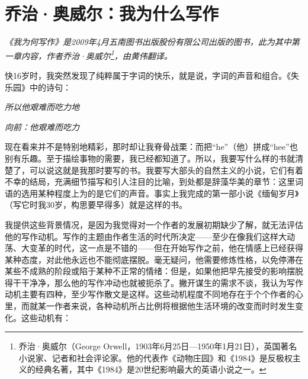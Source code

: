 \documentclass[fontset=fandol,12pt,a5paper]{ctexbook}
\begin{document}
\newpage

\section{乔治·奥威尔：我为什么写作}

\emph{《我为何写作》是2009年4月五南图书出版股份有限公司出版的图书，此为其中第一章内容，作者乔治·奥威尔\footnote{乔治·奥威尔（George Orwell，1903年6月25日—1950年1月21日），英国著名小说家、记者和社会评论家。他的代表作《动物庄园》和《1984》是反极权主义的经典名著，其中《1984》是20世纪影响最大的英语小说之一。}，由黄伟翻译。}
\vspace{2em}

快16岁时，我突然发现了纯粹属于字词的快乐，就是说，字词的声音和组合。《失乐园》中的诗句：

\centerline{\emph{所以他艰难而吃力地}}
\centerline{\emph{向前：他艰难而吃力}}

现在看来并不是特别地精彩，那时却让我脊骨战栗：而把“he”（他）拼成“hee”也别有乐趣。至于描绘事物的需要，我已经都知道了。所以，我要写什么样的书就清楚了，可以说这就是我那时要写的书。我要写大部头的自然主义的小说，它们有着不幸的结局，充满细节描写和引人注目的比喻，到处都是辞藻华美的章节：这里词语的选用某种程度上为的是它们的声音。事实上我完成的第一部小说《缅甸岁月》（写它时我30岁，构思要早得多）就是这样的书。

我提供这些背景情况，是因为我觉得对一个作者的发展初期缺少了解，就无法评估他的写作动机。写作的主题由作者生活的时代所决定——至少在像我们这样大动荡、大变革的时代，这一点是不错的——但在开始写作之前，他在情感上已经获得某种态度，对此他永远也不能彻底摆脱。毫无疑问，他需要修炼性格，以免停滞在某些不成熟的阶段或陷于某种不正常的情绪：但是，如果他把早先接受的影响摆脱得干干净净，那么他的写作冲动也就被扼杀了。撇开谋生的需求不谈，我认为写作动机主要有四种，至少写作散文是这样。这些动机程度不同地存在于个个作者的心里，而就某一作者来说，各种动机所占比例将根据他生活环境的改变而时时发生变化。这些动机有：
\end{document}
